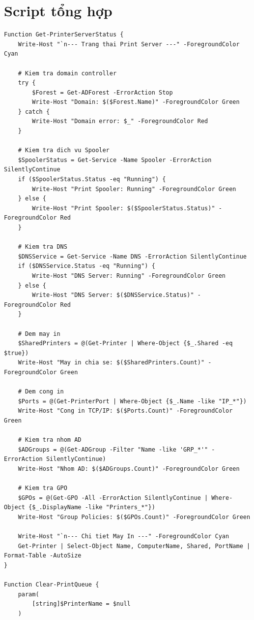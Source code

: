 \section{Script tổng hợp}
\begin{lstlisting}[style=powershell]
Function Get-PrinterServerStatus {
    Write-Host "`n--- Trang thai Print Server ---" -ForegroundColor Cyan
    
    # Kiem tra domain controller
    try {
        $Forest = Get-ADForest -ErrorAction Stop
        Write-Host "Domain: $($Forest.Name)" -ForegroundColor Green
    } catch {
        Write-Host "Domain error: $_" -ForegroundColor Red
    }
    
    # Kiem tra dich vu Spooler
    $SpoolerStatus = Get-Service -Name Spooler -ErrorAction SilentlyContinue
    if ($SpoolerStatus.Status -eq "Running") {
        Write-Host "Print Spooler: Running" -ForegroundColor Green
    } else {
        Write-Host "Print Spooler: $($SpoolerStatus.Status)" -ForegroundColor Red
    }
    
    # Kiem tra DNS
    $DNSService = Get-Service -Name DNS -ErrorAction SilentlyContinue
    if ($DNSService.Status -eq "Running") {
        Write-Host "DNS Server: Running" -ForegroundColor Green
    } else {
        Write-Host "DNS Server: $($DNSService.Status)" -ForegroundColor Red
    }
    
    # Dem may in
    $SharedPrinters = @(Get-Printer | Where-Object {$_.Shared -eq $true})
    Write-Host "May in chia se: $($SharedPrinters.Count)" -ForegroundColor Green
    
    # Dem cong in
    $Ports = @(Get-PrinterPort | Where-Object {$_.Name -like "IP_*"})
    Write-Host "Cong in TCP/IP: $($Ports.Count)" -ForegroundColor Green
    
    # Kiem tra nhom AD
    $ADGroups = @(Get-ADGroup -Filter "Name -like 'GRP_*'" -ErrorAction SilentlyContinue)
    Write-Host "Nhom AD: $($ADGroups.Count)" -ForegroundColor Green
    
    # Kiem tra GPO
    $GPOs = @(Get-GPO -All -ErrorAction SilentlyContinue | Where-Object {$_.DisplayName -like "Printers_*"})
    Write-Host "Group Policies: $($GPOs.Count)" -ForegroundColor Green
    
    Write-Host "`n--- Chi tiet May In ---" -ForegroundColor Cyan
    Get-Printer | Select-Object Name, ComputerName, Shared, PortName | Format-Table -AutoSize
}

Function Clear-PrintQueue {
    param(
        [string]$PrinterName = $null
    )
    

\end{lstlisting}
